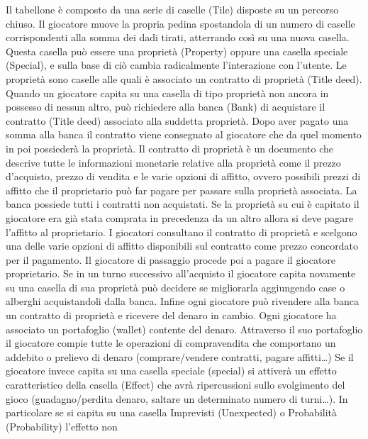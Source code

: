 Il tabellone è composto da una serie di caselle (Tile) disposte su un percorso chiuso. Il giocatore muove la propria pedina spostandola di 
un numero di caselle corrispondenti alla somma dei dadi tirati, atterrando così su una nuova casella. 
Questa casella può essere una proprietà (Property) oppure una casella speciale (Special), 
e sulla base di ciò cambia radicalmente l’interazione con l’utente.\newline
Le proprietà sono caselle alle quali è associato un contratto di proprietà (Title deed). 
Quando un giocatore capita su una casella di tipo proprietà non ancora in possesso di nessun altro, può richiedere alla banca (Bank) di acquistare
il contratto (Title deed) associato alla suddetta proprietà.
Dopo aver pagato una somma alla banca il contratto viene consegnato al giocatore che da quel momento in poi possiederà la proprietà.
Il contratto di proprietà è un documento che descrive tutte le informazioni monetarie relative alla proprietà come il prezzo d'acquisto,
prezzo di vendita e le varie opzioni di affitto, ovvero possibili prezzi di affitto che il proprietario
può far pagare per passare sulla proprietà associata.
La banca possiede tutti i contratti non acquistati.\newline
Se la proprietà su cui è capitato il giocatore era già stata comprata in precedenza da un altro allora si 
deve pagare l'affitto al proprietario. I giocatori consultano il contratto di proprietà e scelgono una delle varie opzioni di affitto
disponibili sul contratto come prezzo concordato per il pagamento. Il giocatore di passaggio procede poi a pagare il giocatore proprietario.
Se in un turno successivo all'acquisto il giocatore capita novamente su una casella di sua proprietà può decidere se migliorarla aggiungendo case 
o alberghi acquistandoli dalla banca.
Infine ogni giocatore può rivendere alla banca un contratto di proprietà e ricevere del denaro in cambio.
Ogni giocatore ha associato un portafoglio (wallet) contente del denaro. Attraverso il suo portafoglio
il giocatore compie tutte le operazioni di compravendita che comportano un addebito o prelievo di denaro (comprare/vendere contratti, pagare affitti\dots)\newline
Se il giocatore invece capita su una casella speciale (special) si attiverà un effetto caratteristico della casella (Effect)
che avrà ripercussioni sullo svolgimento del gioco 
(guadagno/perdita denaro, saltare un determinato numero di turni\dots). 
In particolare se si capita su una casella Imprevisti (Unexpected) o Probabilità (Probability) l'effetto non 
